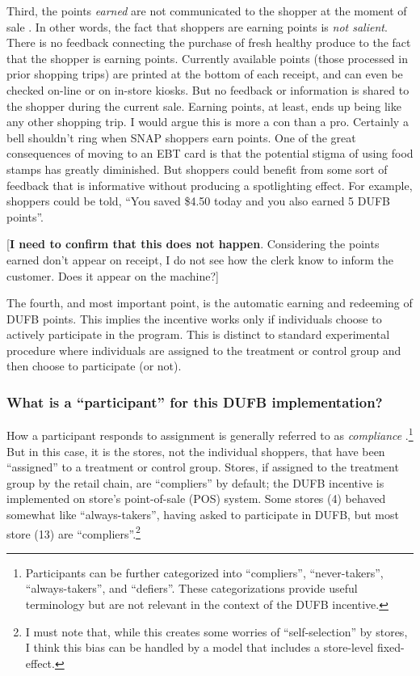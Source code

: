 \documentclass[12pt,letterpaperpaper,]{book}
\begin{document}
Third, the points \emph{earned} are not communicated to the shopper at
the moment of sale \citep{family_fare_double_2016}. In other words, the
fact that shoppers are earning points is \emph{not salient}. There is no
feedback connecting the purchase of fresh healthy produce to the fact
that the shopper is earning points. Currently available points (those
processed in prior shopping trips) are printed at the bottom of each
receipt, and can even be checked on-line or on in-store kiosks. But no
feedback or information is shared to the shopper during the current
sale. Earning points, at least, ends up being like any other shopping
trip. I would argue this is more a con than a pro. Certainly a bell
shouldn't ring when SNAP shoppers earn points. One of the great
consequences of moving to an EBT card is that the potential stigma of
using food stamps has greatly diminished. But shoppers could benefit
from some sort of feedback that is informative without producing a
spotlighting effect. For example, shoppers could be told, ``You saved
\$4.50 today and you also earned 5 DUFB points''.

{[}\textbf{I need to confirm that this does not happen}. Considering the
points earned don't appear on receipt, I do not see how the clerk know
to inform the customer. Does it appear on the machine?{]}

The fourth, and most important point, is the automatic earning and
redeeming of DUFB points. This implies the incentive works only if
individuals choose to actively participate in the program. This is
distinct to standard experimental procedure where individuals are
assigned to the treatment or control group and then choose to
participate (or not).

\subsubsection*{\texorpdfstring{What is a ``participant'' for this DUFB
implementation?}{What is a participant for this DUFB implementation?}}\label{what-is-a-participant-for-this-dufb-implementation}

How a participant responds to assignment is generally referred to as
\emph{compliance} \citep{angrist_mostly_2008}.\footnote{Participants can
  be further categorized into ``compliers'', ``never-takers'',
  ``always-takers'', and ``defiers''. These categorizations provide
  useful terminology but are not relevant in the context of the DUFB
  incentive.} But in this case, it is the stores, not the individual
shoppers, that have been ``assigned'' to a treatment or control group.
Stores, if assigned to the treatment group by the retail chain, are
``compliers'' by default; the DUFB incentive is implemented on store's
point-of-sale (POS) system. Some stores (4) behaved somewhat like
``always-takers'', having asked to participate in DUFB, but most store
(13) are ``compliers''.\footnote{I must note that, while this creates
  some worries of ``self-selection'' by stores, I think this bias can be
  handled by a model that includes a store-level fixed-effect.}
\end{document}

